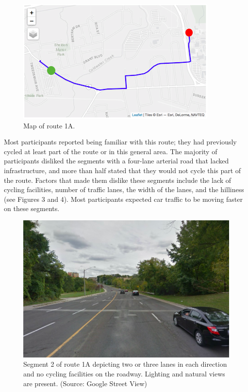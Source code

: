 \documentclass[]{elsarticle} %
\begin{document}
\begin{figure}

{\centering \includegraphics[width=0.65\linewidth]{Route 1A} 

}

\caption{Map of route 1A.}\label{fig:figure-2}
\end{figure}

Most participants reported being familiar with this route; they had
previously cycled at least part of the route or in this general area.
The majority of participants disliked the segments with a four-lane
arterial road that lacked infrastructure, and more than half stated that
they would not cycle this part of the route. Factors that made them
dislike these segments include the lack of cycling facilities, number of
traffic lanes, the width of the lanes, and the hilliness (see Figures 3
and 4). Most participants expected car traffic to be moving faster on
these segments.

\begin{figure}

{\centering \includegraphics[width=0.65\linewidth]{Figure 3} 

}

\caption{Segment 2 of route 1A depicting two or three lanes in each direction and no cycling facilities on the roadway. Lighting and natural views are present. (Source: Google Street View)}\label{fig:figure-3}
\end{figure}
\end{document}
